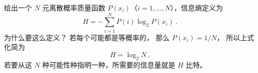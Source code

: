 
\begin{issues}
\issueDraft
\end{issues}

给出一个 $N$ 元离散概率质量函数 $P(x_i)$（$i=1,\dots,N$），信息熵定义为
\begin{equation}
H = -\sum_{i=1}^N P(i) \log_2 P(x_i)~.
\end{equation}
为什么要这么定义？ 若每个可能都是等概率的， 那么 $P(x_i) = 1/N$， 所以上式化简为
\begin{equation}
H = \log_2 N~.
\end{equation}
若要从这 $N$ 种可能性种指明一种，所需要的信息量就是 $H$ 比特。
